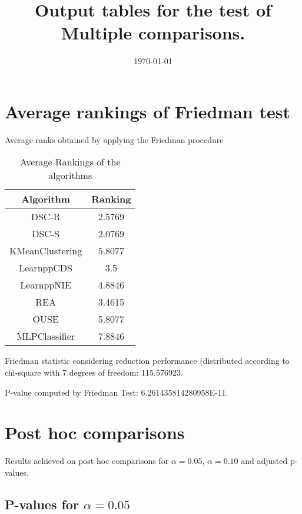 \documentclass[a4paper,10pt]{article}
\title{Output tables for the test of Multiple comparisons.}
\author{}
\date{\today}
\begin{document}
\begin{landscape}
\pagestyle{empty}
\maketitle
\thispagestyle{empty}
\section{Average rankings of Friedman test}



Average ranks obtained by applying the Friedman procedure

\begin{table}[!htp]
\centering
\begin{tabular}{|c|c|}\hline
Algorithm&Ranking\\\hline
DSC-R & 2.5769\\
DSC-S & 2.0769\\
KMeanClustering & 5.8077\\
LearnppCDS & 3.5\\
LearnppNIE & 4.8846\\
REA & 3.4615\\
OUSE & 5.8077\\
MLPClassifier & 7.8846\\
\hline
\end{tabular}
\caption{Average Rankings of the algorithms}
\end{table}

Friedman statistic considering reduction performance (distributed according to chi-square with 7 degrees of freedom: 115.576923.

P-value computed by Friedman Test: 6.261435814280958E-11.\newline



\pagebreak

\section{Post hoc comparisons}

Results achieved on post hoc comparisons for $\alpha = 0.05$, $\alpha = 0.10$ and adjusted p-values.

\subsection{P-values for $\alpha=0.05$}


\end{landscape}
\end{document}
